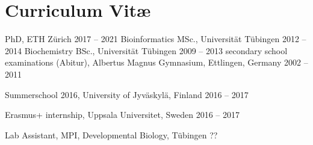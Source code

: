 \chapter{Curriculum Vit\ae}
\vspace{-1cm}
\begin{cvlist}
\end{cvlist}

\begin{cvlist}
\cventry
    {PhD, ETH Z\"{u}rich } %
    {2017 -- 2021} %
\cventry
    {Bioinformatics MSc., Universit\"{a}t T\"{u}bingen} %
    {2012 -- 2014} %
\cventry
    {Biochemistry BSc., Universit\"{a}t T\"{u}bingen} %
    {2009 -- 2013} %
\cventry
    {secondary school examinations (Abitur), Albertus Magnus Gymnasium, Ettlingen, Germany} %
    {2002 -- 2011} 
\end{cvlist}

\begin{cvlist}
	\cventry
	{Summerschool 2016,  University of Jyväskylä, Finland} %
	{2016 -- 2017} %
	
	\cventry
	{Erasmus+ internship, Uppsala Universitet, Sweden} %
	{2016 -- 2017} %
	
	\cventry
    {Lab Assistant, MPI, Developmental Biology, T\"{u}bingen} %
    {??} %

\end{cvlist}
